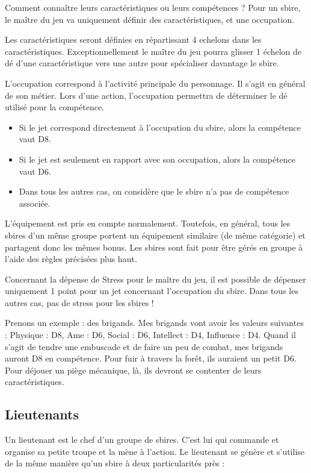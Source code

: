 \begin{multicols}{2}
Comment connaître leurs caractéristiques ou leurs compétences ? Pour un sbire, le maître du jeu va uniquement définir des caractéristiques, et une occupation. 

Les caractéristiques seront définies en répartissant 4 echelons dans les caractéristiques. Exceptionnellement le maître du jeu pourra glisser 1 échelon de dé d'une caractéristique vers une autre pour spécialiser davantage le sbire. 

L'occupation correspond à l'activité principale du personnage. Il s'agit en général de son métier. Lors d'une action, l'occupation permettra de déterminer le dé utilisé pour la compétence. 

\begin{itemize}
\item Si le jet correspond directement à l'occupation du sbire, alors la compétence vaut D8.
\item Si le jet est seulement en rapport avec son occupation, alors la compétence vaut D6.
\item Dans tous les autres cas, on considère que le sbire n'a pas de compétence associée.
\end{itemize}

L'équipement est pris en compte normalement. Toutefois, en général, tous les sbires d'un même groupe portent un équipement similaire (de même catégorie) et partagent donc les mêmes bonus. Les sbires sont fait pour être gérés en groupe à l'aide des règles précisées plus haut.

Concernant la dépense de Stress pour le maître du jeu, il est possible de dépenser uniquement 1 point pour un jet concernant l'occupation du sbire. Dans tous les autres cas, pas de stress pour les sbires ! 

Prenons un exemple : des brigands. Mes brigands vont avoir les valeurs suivantes : Physique : D8, Ame : D6, Social : D6, Intellect : D4, Influence : D4. Quand il s'agit de tendre une embuscade et de faire un peu de combat, mes brigands auront D8 en compétence. Pour fuir à travers la forêt, ils auraient un petit D6. Pour déjouer un piège mécanique, là, ils devront se contenter de leurs caractéristiques.

\subsection{Lieutenants}

Un lieutenant est le chef d'un groupe de sbires. C'est lui qui commande et organise sa petite troupe et la mène à l'action. Le lieutenant se génère et s'utilise de la même manière qu'un sbire à deux particularités près :


\end{multicols}
